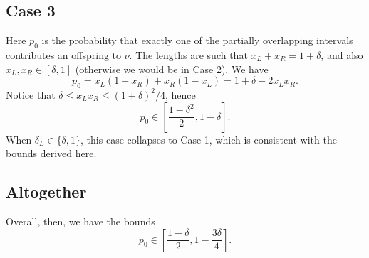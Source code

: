 \documentclass[fleqn]{article}
\begin{document}
\subsection*{Case 3}
Here $p_0$ is the probability that exactly one of the partially overlapping intervals contributes an offspring to $\nu$. 
The lengths are such that $x_L + x_R = 1+\delta$, and also $x_L, x_R \in [\delta,1]$ (otherwise we would be in Case 2).
We have
\begin{equation}
p_0 
= x_L(1-x_R) + x_R(1-x_L)
= 1 + \delta - 2x_Lx_R .
\end{equation}
Notice that $\delta \leq x_Lx_R \leq (1+\delta)^2/4$, hence
\begin{equation}
p_0 \in \left[ \frac{1-\delta^2}{2}, 1-\delta \right] .
\end{equation}
When $\delta_L \in \{\delta, 1 \}$, this case collapses to Case 1, which is consistent with the bounds derived here.

\subsection*{Altogether}
Overall, then, we have the bounds
\begin{equation}
p_0 \in \left[ \frac{1-\delta}{2}, 1- \frac{3\delta}{4} \right] .
\end{equation}
\end{document}
